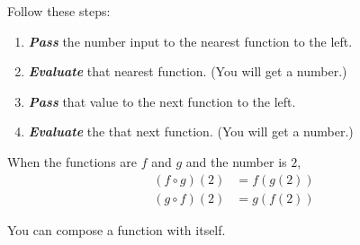 \documentclass[fleqn,letterpaper,12pt,printwatermark=false]{memoir}
\begin{document}
\begin{myKeyConcepts}
    Follow these steps:
    \begin{enumerate}
        \item {\bfseries\itshape Pass} the number input to the nearest function to the left.
        \item {\bfseries\itshape Evaluate} that nearest function. (You will get a number.)
        \item {\bfseries\itshape Pass} that value to the next function to the left. 
        \item {\bfseries\itshape Evaluate} the that next function. (You will get a number.)
    \end{enumerate}
    When the functions are $f$ and $g$ and the number is $2$,
    \begin{align*}
        (f \circ g)(2) &= f(g(2)) \\
        (g \circ f)(2) &= g(f(2))
    \end{align*}
\end{myKeyConcepts}




You can compose a function with itself.

\end{document}
